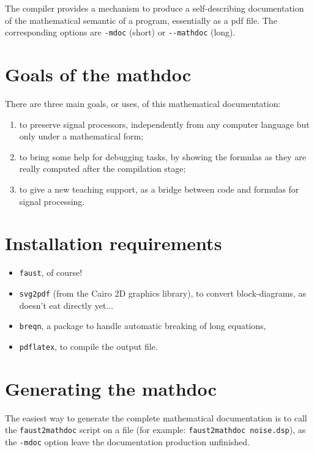 \documentclass[a4paper]{book}
\begin{document}
The \faust compiler provides a mechanism to produce a self-describing documentation of the mathematical semantic of a \faust program, essentially as a pdf file. The corresponding options are \lstinline!-mdoc! (short) or \lstinline!--mathdoc! (long).

\section{Goals of the mathdoc}
\label{sec:goals-of-mdoc}

There are three main goals, or uses, of this mathematical documentation:
\begin{enumerate}
\item to preserve signal processors, independently from any computer language but only under a mathematical form;
\item to bring some help for debugging tasks, by showing the formulas as they are really computed after the compilation stage;
\item to give a new teaching support, as a bridge between code and formulas for signal processing.
\end{enumerate}

\section{Installation requirements}
\label{sec:inst-requ}

\begin{itemize}
\item \lstinline!faust!, of course!
\item \lstinline!svg2pdf! (from the Cairo 2D graphics library), to convert block-diagrams, as \latex doesn't eat \svg directly yet...
\item \lstinline!breqn!, a \latex package to handle automatic breaking of long equations,
\item \lstinline!pdflatex!, to compile the \latex output file.
\end{itemize}


\section{Generating the mathdoc}
\label{sec:generating-mdoc}

The easiest way to generate the complete mathematical documentation is to call the \lstinline!faust2mathdoc! script on a \faust file (for example: \lstinline!faust2mathdoc noise.dsp!), as the \lstinline!-mdoc! option leave the documentation production unfinished.
\end{document}
